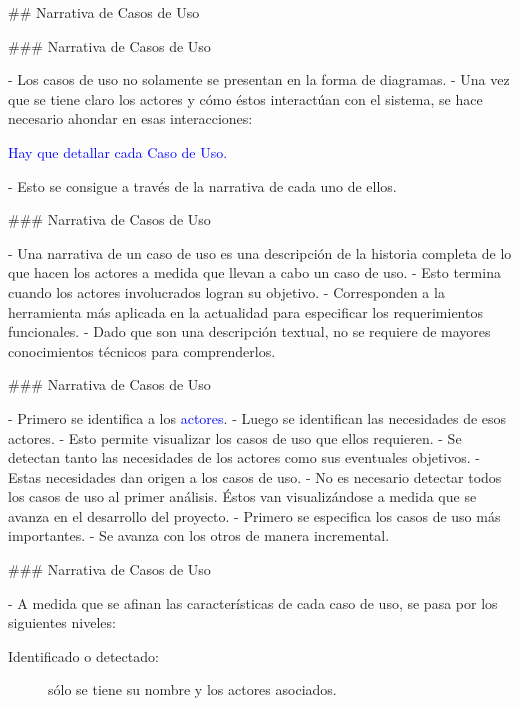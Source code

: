 ## Narrativa de Casos de Uso

### Narrativa de Casos de Uso

- Los casos de uso no solamente se presentan en la forma de diagramas.
- Una vez que se tiene claro los actores y cómo éstos interactúan con el sistema, se hace
necesario ahondar en esas interacciones:

\begin{rboxx}{}
    \textcolor{blue}{Hay que detallar cada Caso de Uso.}
\end{rboxx}

- Esto se consigue a través de la narrativa de cada uno de ellos.

### Narrativa de Casos de Uso


- Una narrativa de un caso de uso es una descripción de la historia completa de lo que hacen los actores
a medida que llevan a cabo un caso de uso.
    - Esto termina cuando los actores involucrados logran su objetivo.
- Corresponden a la herramienta más aplicada en la actualidad para especificar los requerimientos funcionales.
- Dado que son una descripción textual, no se requiere de mayores conocimientos técnicos para comprenderlos.

### Narrativa de Casos de Uso


- Primero se identifica a los \textcolor{blue}{actores}.
- Luego se identifican las necesidades de esos actores.
    - Esto permite visualizar los casos de uso que ellos requieren.
    - Se detectan tanto las necesidades de los actores como sus eventuales objetivos.
- Estas necesidades dan origen a los casos de uso.
- No es necesario detectar todos los casos de uso al primer análisis. Éstos van visualizándose
a medida que se avanza en el desarrollo del proyecto.
    - Primero se especifica los casos de uso más importantes.
    - Se avanza con los otros de manera incremental.

### Narrativa de Casos de Uso


- A medida que se afinan las características de cada caso de uso, se pasa por los siguientes
niveles:

\begin{rboxx}[100mm]{}
\begin{description}
    \item[Identificado o detectado:] sólo se tiene su nombre y los actores asociados.
\end{description}
\end{rboxx}

